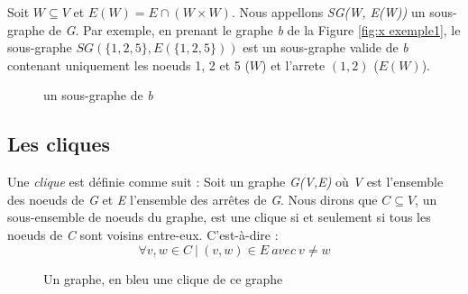 \documentclass[12pt,a4paper]{article}
\begin{document}
Soit $ W \subseteq V $ et $ E(W) = E \cap (W \times W) $. Nous appellons \emph{SG(W, E(W))} un sous-graphe de \emph{G}.
Par exemple, en prenant le graphe \textit{b} de la Figure \ref{fig:x exemple1}, le sous-graphe \(SG(\{1, 2, 5\}, E(\{1, 2, 5\}))\) est un sous-graphe valide de \textit{b} contenant uniquement les noeuds 1, 2 et 5 (\(W\)) et l'arrete \((1,2)\) (\(E(W)\)).

\begin{figure}
  \centering
  \caption{un sous-graphe de \textit{b}}
\end{figure}

\subsection{Les cliques}%
\label{subsec:cliques}

Une \textit{clique} est définie comme suit :
Soit un graphe \emph{G(V,E)} où \emph{V} est l'ensemble des noeuds de \emph{G} et \emph{E} l'ensemble des arrêtes de \emph{G}. Nous dirons que \(C \subseteq V\), un sous-ensemble de noeuds du graphe, est une clique si et seulement si tous les noeuds de \emph{C} sont voisins entre-eux.
C'est-à-dire :
\begin{equation}
\forall v, w \in C \ | \ (v, w)\in E \ avec\  v \neq w
\end{equation}

\begin{figure}[h]
  \centering
  \caption{Un graphe, en bleu une clique de ce graphe}
  \label{fig:x clique1}
\end{figure}
\end{document}
